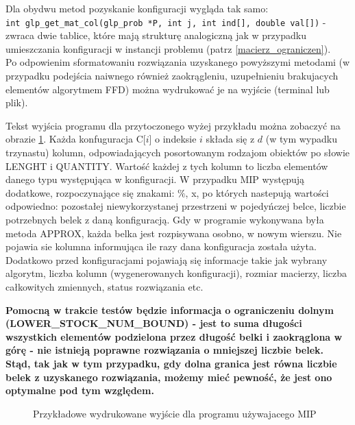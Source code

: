 Dla obydwu metod pozyskanie konfiguracji wygląda tak samo: \\
\verb|int glp_get_mat_col(glp_prob *P, int j, int ind[], double val[])| - zwraca dwie tablice, które mają strukturę analogiczną jak w przypadku umieszczania konfiguracji w instancji problemu (patrz \ref{macierz_ograniczen}). \\


Po odpowienim sformatowaniu rozwiązania uzyskanego powyższymi metodami (w przypadku podejścia naiwnego również zaokrągleniu, uzupełnieniu brakujacych elementów algorytmem FFD) można wydrukować je na wyjście (terminal lub plik).

Tekst wyjścia programu dla przytoczonego wyżej przykładu można zobaczyć na obrazie \ref{output_example}. Każda konfuguracja C[$i$] o indeksie $i$ składa się z $d$ (w tym wypadku trzynastu) kolumn, odpowiadających posortowanym rodzajom obiektów po słowie LENGHT i QUANTITY. Wartość każdej z tych kolumn to liczba elementów danego typu występująca w konfiguracji. 
W przypadku MIP występują dodatkowe, rozpoczynające się znakami: $\%$, x, po których nastepują wartości odpowiedno: pozostałej niewykorzystanej przestrzeni w pojedyńczej belce, liczbie potrzebnych belek z daną konfiguracją.
Gdy w programie wykonywana była metoda APPROX, każda belka jest rozpisywana osobno, w nowym wierszu. Nie pojawia sie kolumna informująca ile razy dana konfiguracja została użyta.
Dodatkowo przed konfiguracjami pojawiają się informacje takie jak wybrany algorytm, liczba kolumn (wygenerowanych konfiguracji), rozmiar macierzy, liczba całkowitych zmiennych, status rozwiązania etc. 

\textbf{Pomocną w trakcie testów będzie informacja o ograniczeniu dolnym \\ (LOWER\_STOCK\_NUM\_BOUND) - jest to suma długości wszystkich elementów podzielona przez długość belki i zaokrąglona w górę - nie istnieją poprawne rozwiązania o mniejszej liczbie belek. Stąd, tak jak w tym przypadku, gdy dolna granica jest równa liczbie belek z uzyskanego rozwiązania, możemy mieć pewność, że jest ono optymalne pod tym względem.}

\begin{figure}[h!]
	
	\caption{Przykładowe wydrukowane wyjście dla programu używajacego MIP}
	\label{output_example}
\end{figure}







